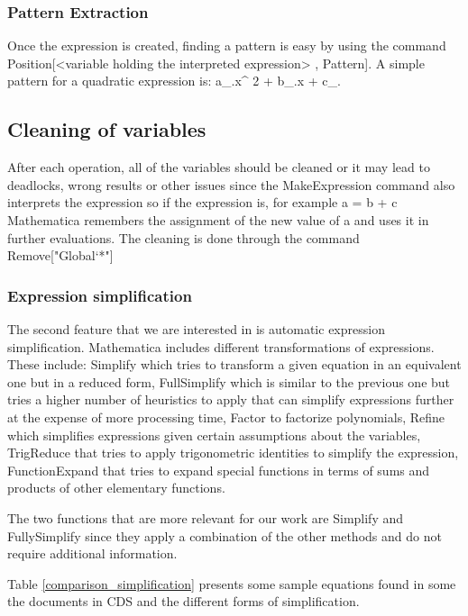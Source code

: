 \subsubsection{Pattern Extraction}
Once the expression is created, finding a pattern is easy by using the command {\codefont Position[<variable holding the interpreted expression> , Pattern]}. A simple pattern for a quadratic expression is: {\codefont a\_.x\^{} 2 + b\_.x + c\_.} 

\subsection{Cleaning of variables}
After each operation, all of the variables should be cleaned or it may lead to deadlocks, wrong results or other issues since the {\codefont MakeExpression} command also interprets the expression so if the expression is, for example {\codefont a = b + c} Mathematica remembers the assignment of the new value of {\codefont a} and uses it in further evaluations. The cleaning is done through the command {\codefont Remove["Global`*"]}

\subsubsection{Expression simplification}
The second feature that we are interested in is automatic expression simplification.
Mathematica includes different transformations of expressions. These include: {\codefont Simplify} which tries to transform a given equation in an equivalent one but in a reduced form, {\codefont FullSimplify} which is similar to the previous one but tries a higher number of heuristics to apply that can simplify expressions further at the expense of more processing time, {\codefont Factor} to factorize polynomials, {\codefont Refine} which simplifies expressions given certain assumptions about the variables, {\codefont TrigReduce} that tries to apply trigonometric identities to simplify the expression, {\codefont FunctionExpand} that tries to expand special functions in terms of sums and products of other elementary functions. 

The two functions that are more relevant for our work are {\codefont Simplify} and {\codefont FullySimplify} since they apply a combination of the other methods and do not require additional information.

Table \ref{comparison_simplification} presents some sample equations found in some the documents in CDS and the different forms of simplification.

